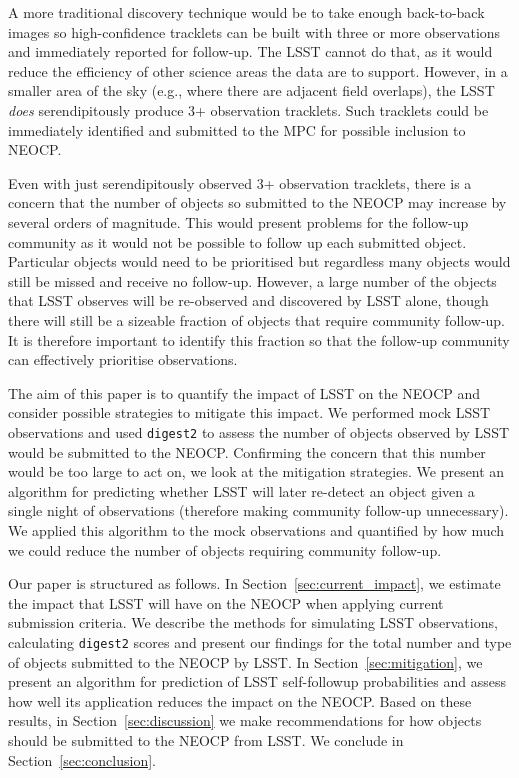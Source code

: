 \documentclass[twocolumn]{aastex631}
\newcommand{\dig}{\texttt{digest2}}
\begin{document}
A more traditional discovery technique would be to take enough back-to-back images so high-confidence tracklets can be built with three or more observations and immediately reported for follow-up. The LSST cannot do that, as it would reduce the efficiency of other science areas the data are to support. However, in a smaller area of the sky (e.g., where there are adjacent field overlaps), the LSST {\em does} serendipitously produce 3+ observation tracklets. Such tracklets could be immediately identified and submitted to the MPC for possible inclusion to NEOCP.

Even with just serendipitously observed 3+ observation tracklets, there is a concern that the number of objects so submitted to the NEOCP may increase by several orders of magnitude. This would present problems for the follow-up community as it would not be possible to follow up each submitted object. Particular objects would need to be prioritised but regardless many objects would still be missed and receive no follow-up. However, a large number of the objects that LSST observes will be re-observed and discovered by LSST alone, though there will still be a sizeable fraction of objects that require community follow-up. It is therefore important to identify this fraction so that the follow-up community can effectively prioritise observations.

The aim of this paper is to quantify the impact of LSST on the NEOCP and consider possible strategies to mitigate this impact. We performed mock LSST observations and used \dig{} to assess the number of objects observed by LSST would be submitted to the NEOCP. Confirming the concern that this number would be too large to act on, we look at the mitigation strategies. We present an algorithm for predicting whether LSST will later re-detect an object given a single night of observations (therefore making community follow-up unnecessary). We applied this algorithm to the mock observations and quantified by how much we could reduce the number of objects requiring community follow-up.

Our paper is structured as follows. In Section~\ref{sec:current_impact}, we estimate the impact that LSST will have on the NEOCP when applying current submission criteria. We describe the methods for simulating LSST observations, calculating \dig{} scores and present our findings for the total number and type of objects submitted to the NEOCP by LSST. In Section~\ref{sec:mitigation}, we present an algorithm for prediction of LSST self-followup probabilities and assess how well its application reduces the impact on the NEOCP. Based on these results, in Section~\ref{sec:discussion} we make recommendations for how objects should be submitted to the NEOCP from LSST. We conclude in Section~\ref{sec:conclusion}.
\end{document}
